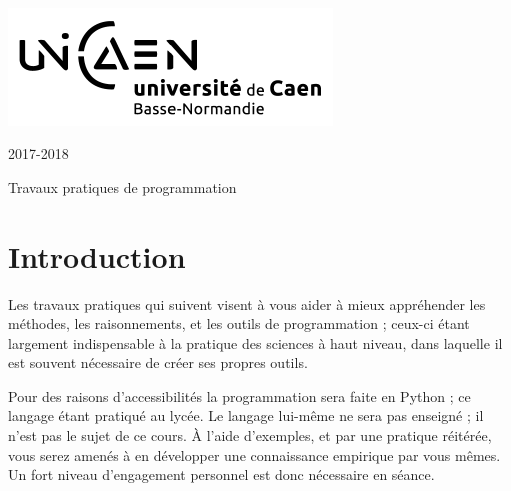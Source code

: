 \documentclass[a4paper,11pt]{article}
\begin{document}
%
\thispagestyle{empty}
\renewcommand{\headrulewidth}{0.0pt}
%

\setlength{\columnsep}{30pt}
\setlength{\columnseprule}{1pt}
\noindent
\begin{minipage}[t]{0.35\textwidth}
~\\[-2ex]
\includegraphics[scale=0.7]{unicaen_logo_rvb_noir_V1}

\end{minipage}
\begin{minipage}[t]{0.50\textwidth}
\end{minipage}
\begin{minipage}[t]{0.12\textwidth}
\flushleft
{
\footnotesize{2017-2018}}
\end{minipage}

\vspace{0.5cm}

\centerline{\sc\Large Travaux pratiques de programmation}
{\let\clearpage\relax \section*{Introduction}}
Les travaux pratiques qui suivent visent à vous aider à mieux appréhender 
les méthodes, les raisonnements, et les outils de programmation ;
ceux-ci étant largement indispensable à la pratique des sciences à
haut niveau, dans laquelle il est souvent nécessaire
de créer ses propres outils. 

Pour des raisons d'accessibilités la programmation sera faite en Python ;
ce langage étant pratiqué au lycée. Le langage lui-même ne sera pas enseigné ; 
il n'est pas le sujet de ce cours.
À l'aide d'exemples, et par une pratique réitérée, 
vous serez amenés à en développer une connaissance empirique par vous mêmes. 
Un fort niveau d'engagement personnel est donc nécessaire en séance. 
\end{document}
